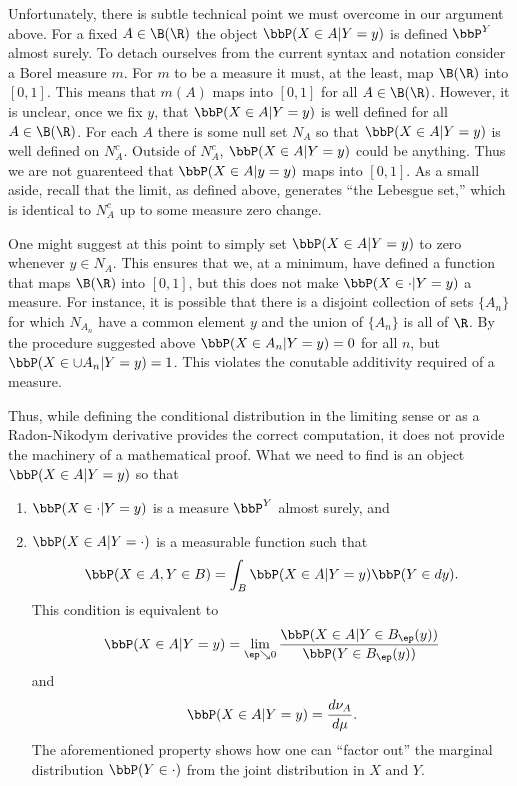 \documentclass{report}
\begin{document}
Unfortunately, there is subtle technical point we must overcome in our argument above.  For a fixed $A \in \B(\R)$ the object $\bbP(X \in A | Y = y)$ is defined $\bbP^Y$ almost surely.  To detach ourselves from the current syntax and notation consider a Borel measure $m$.  For $m$ to be a measure it must, at the least, map $\B(\R)$ into $[0,1]$.  This means that $m(A)$ maps into $[0,1]$ for all $A \in \B(\R)$.  However, it is unclear, once we fix $y$, that $\bbP(X \in A | Y = y)$ is well defined for all $A \in \B(\R)$.  For each $A$ there is some null set $N_A$ so that $\bbP(X \in A | Y = y)$ is well defined on $N_A^c$.  Outside of $N_A^c$, $\bbP(X \in A | Y = y)$ could be anything.  Thus we are not guarenteed that $\bbP(X \in A | y = y)$ maps into $[0,1]$.  As a small aside, recall that the limit, as defined above, generates ``the Lebesgue set,'' which is identical to $N_A^c$ up to some measure zero change.

One might suggest at this point to simply set $\bbP(X \in A | Y = y)$ to zero whenever $y \in N_A$.  This ensures that we, at a minimum, have defined a function that maps $\B(\R)$ into $[0,1]$, but this does not make $\bbP(X \in \cdot | Y = y)$ a measure.  For instance, it is possible that there is a disjoint collection of sets $\{A_n\}$ for which $N_{A_n}$ have a common element $y$ and the union of $\{A_n\}$ is all of $\R$.  By the procedure suggested above $\bbP(X \in A_n | Y = y) = 0$ for all $n$, but $\bbP(X \in \cup A_n | Y = y) = 1$.  This violates the conutable additivity required of a measure.

Thus, while defining the conditional distribution in the limiting sense or as a Radon-Nikodym derivative provides the correct computation, it does not provide the machinery of a mathematical proof.  What we need to find is an object $\bbP(X \in A | Y = y)$ so that
\begin{enumerate}
\item $\bbP(X \in \cdot | Y = y)$ is a measure $\bbP^Y$ almost surely, and
\item $\bbP(X \in A | Y = \cdot)$ is a measurable function such that
\[
\bbP(X \in A, Y \in B) = \int_B \bbP(X \in A | Y = y) \bbP(Y \in dy).
\]
This condition is equivalent to
\[
\bbP(X \in A | Y = y) = \lim_{\ep \searrow 0} \frac{\bbP(X \in A | Y \in B_\ep(y))}{\bbP(Y \in B_\ep(y))}
\]
and
\[
\bbP(X \in A | Y = y) = \frac{d \nu_A}{d \mu}.
\]
The aforementioned property shows how one can ``factor out'' the marginal distribution $\bbP(Y \in \cdot)$ from the joint distribution in $X$ and $Y$.
\end{enumerate}
\end{document}
